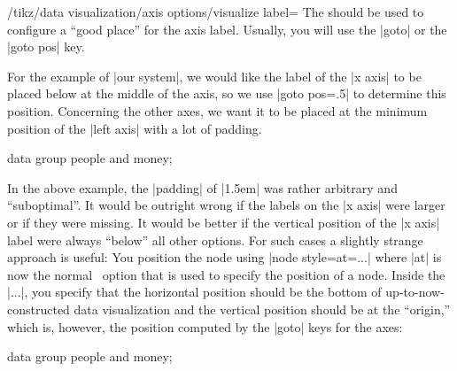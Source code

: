 \begin{key}{/tikz/data visualization/axis options/visualize label=}
  The  should be used to configure a ``good place'' for
  the axis label. Usually, you will use the |goto| or the |goto pos|
  key.

  For the example of |our system|, we would like the label of the
  |x axis| to be placed below at the middle of the axis, so we use
  |goto pos=.5| to determine this position. Concerning the other axes,
  we want it to be placed at the minimum position of the |left axis|
  with a lot of padding.
\begin{codeexample}[width=7cm]
\tikz \datavisualization [
    our system,     
    x axis={attribute=time, ticks=some, label},
    left axis ={attribute=money},
    right axis={attribute=people},
    visualize as line/.list={
      people 1, people 2, money 1, money 2}]
  data group {people and money};  
\end{codeexample}

  In the above example, the |padding| of |1.5em| was rather arbitrary
  and ``suboptimal''. It would be outright wrong if the labels on the |x axis| were larger or
  if they were missing. It would be better if the vertical position of
  the |x axis| label were always ``below'' all other options. For such
  cases a slightly strange approach is useful: You position the node
  using |node style={at=...}| where |at| 
  is now the normal \tikzname\ option that is used to specify the
  position of a node. Inside the |...|, you specify that the
  horizontal position should be the bottom of up-to-now-constructed
  data visualization and the vertical position should be at the
  ``origin,'' which is, however, the position computed by the |goto|
  keys for the axes:
\begin{codeexample}[width=7cm]
\tikz \datavisualization [
    our system,     
    x axis={attribute=time, ticks=some, label=Year},
    left axis ={attribute=money},
    right axis={attribute=people},
    visualize as line/.list={
      people 1, people 2, money 1, money 2}]
  data group {people and money};  
\end{codeexample}


\end{key}
